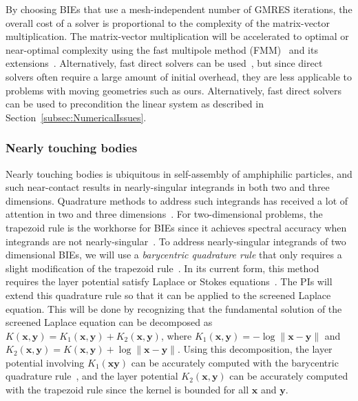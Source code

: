 By choosing BIEs that use a mesh-independent number of GMRES iterations,
the overall cost of a solver is proportional to the complexity of the
matrix-vector multiplication. The matrix-vector multiplication will be
accelerated to optimal or near-optimal complexity using the fast
multipole method (FMM)~\cite{fmm5} and its extensions~\cite{fmm1, fmm2,
fmm3, fmm4, fmm6, fmm7, fmm8}. Alternatively, fast direct solvers can be
used~\cite{fds1, fds2, fds3, fds4, fds5, fds6, fds7, fds8, ho2016cpam2,
ho2016cpam1, minden2016, minden2017siammms}, but since direct solvers
often require a large amount of initial overhead, they are less
applicable to problems with moving geometries such as ours.
Alternatively, fast direct solvers can be used to precondition the
linear system as described in Section~\ref{subsec:NumericalIssues}.

\subsubsection{Nearly touching bodies}
Nearly touching bodies is ubiquitous in self-assembly of amphiphilic
particles, and such near-contact results in nearly-singular integrands
in both two and three dimensions. Quadrature methods to address such
integrands has received a lot of attention in two and three
dimensions~\cite{alpert, kapur, sidi, duffy, bruno1, bruno2, davis_1984,
graglia_2008, hackbusch_sauter_1994, jarvenpaa_2003, khayat_2005,
schwab_1992, ying_2006, beale1, beale2, goodman_1990, haroldson_1998,
lowengrub_1993, schwab_1992, ggq1, ggq2, ggq3, helsing_2008a,
helsing_integral_2009, helsing_tutorial_2012, klockner2013jcp, qbx2,
wala2019jcp, af2018sisc, siegel2018jcp, rachh2017jcp, ding2019arxiv,
bar2014}. For two-dimensional problems, the trapezoid rule is the
workhorse for BIEs since it achieves spectral accuracy when integrands
are not nearly-singular~\cite{tre-wei2014}. To address nearly-singular
integrands of two dimensional BIEs, we will use a {\em barycentric
quadrature rule} that only requires a slight modification of the
trapezoid rule~\cite{ioa-pap-per1991}. In its current form, this method
requires the layer potential satisfy Laplace or Stokes
equations~\cite{bar-wu-vee2015, chi-moo-qua2020}. The PIs will extend
this quadrature rule so that it can be applied to the screened Laplace
equation. This will be done by recognizing that the fundamental solution
of the screened Laplace equation can be decomposed as
$K(\mathbf{x},\mathbf{y}) = K_1(\mathbf{x},\mathbf{y}) +
K_2(\mathbf{x},\mathbf{y})$, where $K_1(\mathbf{x},\mathbf{y}) =
-\log\|\mathbf{x} - \mathbf{y}\|$ and $K_2(\mathbf{x},\mathbf{y}) =
K(\mathbf{x},\mathbf{y}) + \log\|\mathbf{x} - \mathbf{y}\|$. Using this
decomposition, the layer potential involving $K_1(\mathbf{x}\mathbf{y})$
can be accurately computed with the barycentric quadrature
rule~\cite{ioa-pap-per1991}, and the layer potential
$K_2(\mathbf{x},\mathbf{y})$ can be accurately computed with the
trapezoid rule since the kernel is bounded for all
$\mathbf{x}$ and $\mathbf{y}$.

